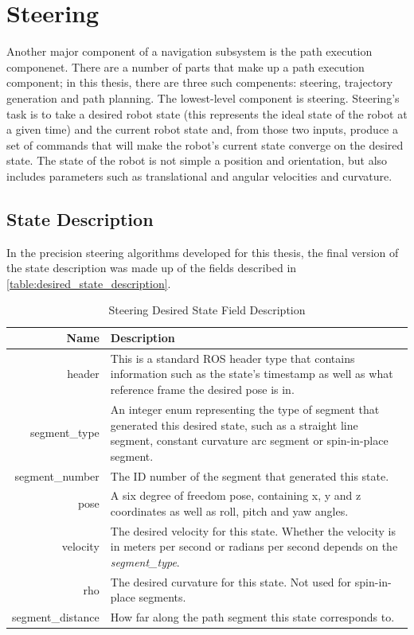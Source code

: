 \section{Steering}\label{sec:steering}

Another major component of a navigation subsystem is the path execution componenet. There are a number of parts that make up a path execution component; in this thesis, there are three such compenents: steering, trajectory generation and path planning. The lowest-level component is steering. Steering's task is to take a desired robot state (this represents the ideal state of the robot at a given time) and the current robot state and, from those two inputs, produce a set of commands that will make the robot's current state converge on the desired state. The state of the robot is not simple a position and orientation, but also includes parameters such as translational and angular velocities and curvature.

\subsection{State Description}\label{subsec:steering_state}

In the precision steering algorithms developed for this thesis, the final version of the state description was made up of the fields described in \autoref{table:desired_state_description}.

\begin{table}[htbp]
	\begin{tabularx}{\textwidth}{|r|X|}
		\hline
		Name & Description \\
		\hline
		header & This is a standard ROS header type that contains information such as the state's timestamp as well as what reference frame the desired pose is in. \\
		\hline
		segment\_type & An integer enum representing the type of segment that generated this desired state, such as a straight line segment, constant curvature arc segment or spin-in-place segment. \\
		\hline
		segment\_number & The ID number of the segment that generated this state. \\
		\hline
		pose & A six degree of freedom pose, containing x, y and z coordinates as well as roll, pitch and yaw angles. \\
		\hline
		velocity & The desired velocity for this state. Whether the velocity is in meters per second or radians per second depends on the \emph{segment\_type}. \\
		\hline
		rho & The desired curvature for this state. Not used for spin-in-place segments. \\
		\hline
		segment\_distance & How far along the path segment this state corresponds to. \\
		\hline
	\end{tabularx}
	\caption{Steering Desired State Field Description \label{table:desired_state_description}}
\end{table}

